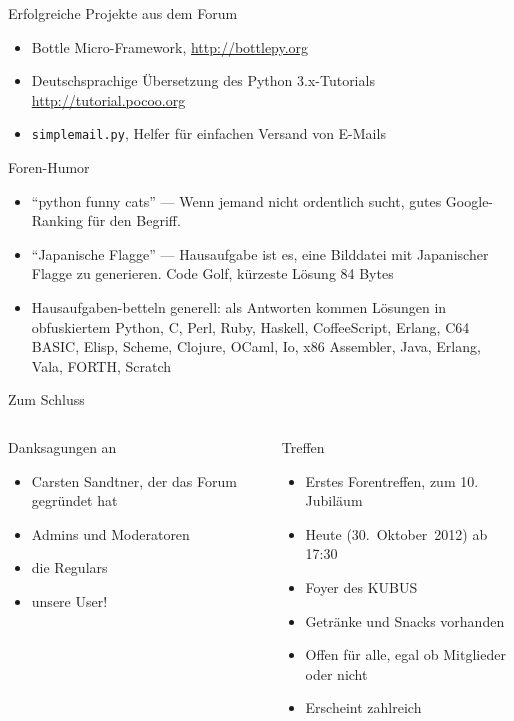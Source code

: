 \documentclass{beamer}
\begin{document}
\begin{frame}{Erfolgreiche Projekte aus dem Forum}
  \begin{itemize}
    \item Bottle Micro-Framework, \url{http://bottlepy.org}
    \item Deutschsprachige Übersetzung des Python 3.x-Tutorials \url{http://tutorial.pocoo.org}
    \item \texttt{simplemail.py}, Helfer für einfachen Versand von E-Mails
  \end{itemize}
\end{frame}

\begin{frame}{Foren-Humor}
  \begin{itemize}
    \item \enquote{python funny cats} — Wenn jemand nicht ordentlich sucht, gutes
      Google-Ranking für den Begriff.
    \item \enquote{Japanische Flagge} — Hausaufgabe ist es, eine Bilddatei mit
      Japanischer Flagge zu generieren. Code Golf, kürzeste Lösung 84 Bytes
    \item Hausaufgaben-betteln generell: als Antworten kommen Lösungen in obfuskiertem
      Python, C, Perl, Ruby, Haskell, CoffeeScript, Erlang, C64 BASIC, Elisp, Scheme,
      Clojure, OCaml, Io, x86 Assembler, Java, Erlang, Vala, FORTH, Scratch
  \end{itemize}
\end{frame}

\begin{frame}{Zum Schluss}
  \begin{columns}[t]
  \begin{block}{Danksagungen an}
    \begin{itemize}
      \item Carsten Sandtner, der das Forum gegründet hat
      \item Admins und Moderatoren
      \item die Regulars
      \item unsere User!
    \end{itemize}
  \end{block}
  \begin{block}{Treffen}
    \begin{itemize}
      \item Erstes Forentreffen, zum 10. Jubiläum
      \item Heute (30.~Oktober~2012) ab 17:30
      \item Foyer des KUBUS
      \item Getränke und Snacks vorhanden
      \item Offen für alle, egal ob Mitglieder oder nicht
      \item Erscheint zahlreich 
    \end{itemize}
  \end{block}
  \end{columns}
\end{frame}
\end{document}
